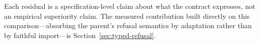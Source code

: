 Each residual is a specification-level claim about what the contract expresses, not an empirical superiority claim. The measured contribution built directly on this comparison---absorbing the parent's refusal semantics by adaptation rather than by faithful import---is Section~\ref{sec:typed-refusal}.
